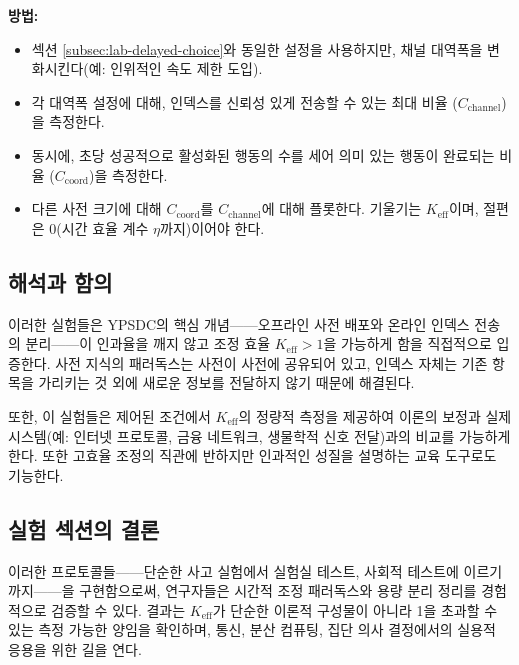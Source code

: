 \documentclass[12pt,a4paper]{article}
\begin{document}
	\textbf{방법:}
	\begin{itemize}
		\item 섹션 \ref{subsec:lab-delayed-choice}와 동일한 설정을 사용하지만, 채널 대역폭을 변화시킨다(예: 인위적인 속도 제한 도입).
		\item 각 대역폭 설정에 대해, 인덱스를 신뢰성 있게 전송할 수 있는 최대 비율 (\(C_{\text{channel}}\))을 측정한다.
		\item 동시에, 초당 성공적으로 활성화된 행동의 수를 세어 의미 있는 행동이 완료되는 비율 (\(C_{\text{coord}}\))을 측정한다.
		\item 다른 사전 크기에 대해 \(C_{\text{coord}}\)를 \(C_{\text{channel}}\)에 대해 플롯한다. 기울기는 \(K_{\mathrm{eff}}\)이며, 절편은 0(시간 효율 계수 \(\eta\)까지)이어야 한다.
	\end{itemize}
	
	\subsection{해석과 함의}
	
	이러한 실험들은 YPSDC의 핵심 개념——오프라인 사전 배포와 온라인 인덱스 전송의 분리——이 인과율을 깨지 않고 조정 효율 \(K_{\mathrm{eff}} > 1\)을 가능하게 함을 직접적으로 입증한다. 사전 지식의 패러독스는 사전이 사전에 공유되어 있고, 인덱스 자체는 기존 항목을 가리키는 것 외에 새로운 정보를 전달하지 않기 때문에 해결된다.
	
	또한, 이 실험들은 제어된 조건에서 \(K_{\mathrm{eff}}\)의 정량적 측정을 제공하여 이론의 보정과 실제 시스템(예: 인터넷 프로토콜, 금융 네트워크, 생물학적 신호 전달)과의 비교를 가능하게 한다. 또한 고효율 조정의 직관에 반하지만 인과적인 성질을 설명하는 교육 도구로도 기능한다.
	
	\subsection{실험 섹션의 결론}
	
	이러한 프로토콜들——단순한 사고 실험에서 실험실 테스트, 사회적 테스트에 이르기까지——을 구현함으로써, 연구자들은 시간적 조정 패러독스와 용량 분리 정리를 경험적으로 검증할 수 있다. 결과는 \(K_{\mathrm{eff}}\)가 단순한 이론적 구성물이 아니라 1을 초과할 수 있는 측정 가능한 양임을 확인하며, 통신, 분산 컴퓨팅, 집단 의사 결정에서의 실용적 응용을 위한 길을 연다.
	
\end{document}
